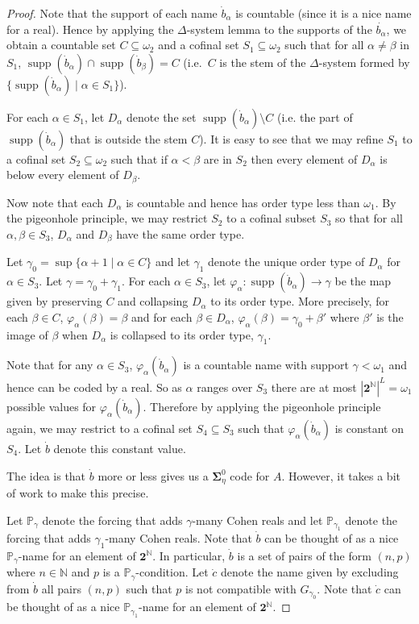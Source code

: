\documentclass[11pt]{amsart}
\newcommand{\N}{\mathbb{N}}
\renewcommand\phi{\varphi}
\newcommand\two{\mathbf{2}}
\newcommand\bbP{\mathbb{P}}
\newcommand\supp{\operatorname{supp}}
\newcommand\Cantor{\two^\N}
\theoremstyle{definition}
\theoremstyle{remark}
\theoremstyle{plain}
\begin{document}
\begin{proof}
Note that the support of each name $\dot{b}_\alpha$ is countable (since it is a nice name for a real). Hence by applying the $\Delta$-system lemma to the supports of the $\dot{b_\alpha}$, we obtain a countable set $C \subseteq \omega_2$ and a cofinal set $S_1 \subseteq \omega_2$ such that for all $\alpha \neq \beta$ in $S_1$, $\supp(\dot{b}_\alpha) \cap \supp(\dot{b}_\beta) = C$ (i.e.\ $C$ is the stem of the $\Delta$-system formed by $\{\supp(\dot{b}_\alpha) \mid \alpha \in S_1\}$).

For each $\alpha \in S_1$, let $D_\alpha$ denote the set $\supp(\dot{b}_\alpha)\setminus C$ (i.e. the part of $\supp(\dot{b}_\alpha)$ that is outside the stem $C$). It is easy to see that we may refine $S_1$ to a cofinal set $S_2 \subseteq \omega_2$ such that if $\alpha < \beta$ are in $S_2$ then every element of $D_\alpha$ is below every element of $D_\beta$.

Now note that each $D_\alpha$ is countable and hence has order type less than $\omega_1$. By the pigeonhole principle, we may restrict $S_2$ to a cofinal subset $S_3$ so that for all $\alpha, \beta \in S_3$, $D_\alpha$ and $D_\beta$ have the same order type.

Let $\gamma_0 = \sup\{\alpha + 1 \mid \alpha \in C\}$ and let $\gamma_1$ denote the unique order type of $D_\alpha$ for $\alpha \in S_3$. Let $\gamma = \gamma_0 + \gamma_1$. For each $\alpha \in S_3$, let $\phi_\alpha \colon \supp(\dot{b}_\alpha) \to \gamma$ be the map given by preserving $C$ and collapsing $D_\alpha$ to its order type. More precisely, for each $\beta \in C$, $\phi_\alpha(\beta) = \beta$ and for each $\beta \in D_\alpha$, $\phi_\alpha(\beta) = \gamma_0 + \beta'$ where $\beta'$ is the image of $\beta$ when $D_\alpha$ is collapsed to its order type, $\gamma_1$.

Note that for any $\alpha \in S_3$, $\phi_\alpha(\dot{b}_\alpha)$ is a countable name with support $\gamma < \omega_1$ and hence can be coded by a real. So as $\alpha$ ranges over $S_3$ there are at most $|\two^\N|^L = \omega_1$ possible values for $\phi_\alpha(\dot{b}_\alpha)$. Therefore by applying the pigeonhole principle again, we may restrict to a cofinal set $S_4 \subseteq S_3$ such that $\phi_\alpha(\dot{b}_\alpha)$ is constant on $S_4$. Let $\dot{b}$ denote this constant value.

The idea is that $\dot{b}$ more or less gives us a $\mathbf{\Sigma}^0_\eta$ code for $A$. However, it takes a bit of work to make this precise.

Let $\bbP_{\gamma}$ denote the forcing that adds $\gamma$-many Cohen reals and let $\bbP_{\gamma_1}$ denote the forcing that adds $\gamma_1$-many Cohen reals. Note that $\dot{b}$ can be thought of as a nice $\bbP_\gamma$-name for an element of $\Cantor$. In particular, $\dot{b}$ is a set of pairs of the form $(n, p)$ where $n \in \N$ and $p$ is a $\bbP_\gamma$-condition. Let $\dot{c}$ denote the name given by excluding from $\dot{b}$ all pairs $(n, p)$ such that $p$ is not compatible with $G_{\gamma_0}$. Note that $\dot{c}$ can be thought of as a nice $\bbP_{\gamma_1}$-name for an element of $\Cantor$.


\end{proof}
\end{document}
